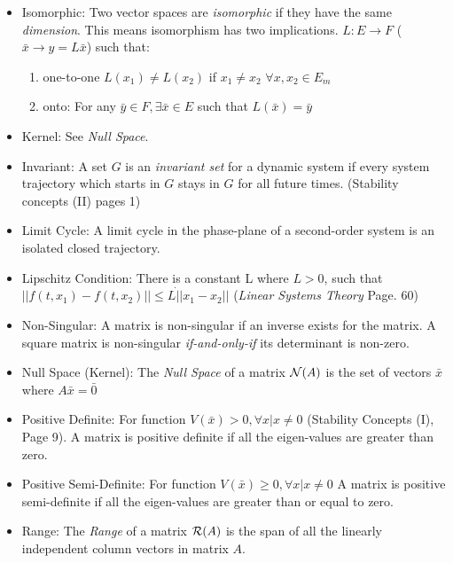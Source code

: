 \documentclass[12pt]{article}
\begin{document}
\begin{itemize}
\item Isomorphic: Two vector spaces are {\em isomorphic} if they have the same {\em dimension}. This means isomorphism has two implications. $L:E\rightarrow F$ ($\bar{x}\rightarrow y=L\bar{x}$) such that:
\begin{enumerate}
	\item one-to-one $L(x_1)\neq L(x_2)$ if $x_1\neq x_2$ $\forall x, x_2 \in E_m$
	\item onto: For any $\bar{y} \in F, \exists \bar{x} \in E$ such that $L(\bar{x})=\bar{y}$
\end {enumerate}

\item Kernel: See { \em Null Space}.

\item Invariant: A set $G$ is an {\em invariant set} for a dynamic system if every system trajectory which starts in $G$ stays in $G$ for all future times. (Stability concepts (II) pages 1)

\item Limit Cycle: A limit cycle in the phase-plane of a second-order system is an isolated closed trajectory. 

\item Lipschitz Condition: There is a constant L where $L>0$, such that $||f(t,x_1)-f(t,x_2)||\leq L\dot ||x_1-x_2||$ ({\em Linear Systems Theory} Page. 60)

\item Non-Singular: A matrix is non-singular if an inverse exists for the matrix. A square matrix is non-singular {\em if-and-only-if} its determinant is non-zero.

\item Null Space (Kernel): The {\em Null Space} of a matrix ${\cal N}(A)$ is the set of vectors $\bar{x}$ where $A\bar{x}=\bar{0}$

\item Positive Definite: For function $V(\bar{x})>0, \forall x | x\neq0$ (Stability Concepts (I), Page 9). A matrix is positive definite if all the eigen-values are greater than zero. 

\item Positive Semi-Definite: For function $V(\bar{x})\geq0, \forall x | x\neq0$ A matrix is positive semi-definite if all the eigen-values are greater than or equal to zero. 

\item Range: The {\em Range} of a matrix ${\cal R}(A)$ is the span of all the linearly independent column vectors in matrix $A$.


\end{itemize}
\end{document}

